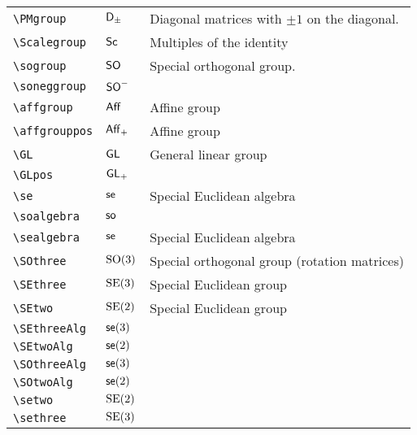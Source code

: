 \begin{longtable}{lll}
 {\color[rgb]{0.5,0.5,0.5}\texttt{\textbackslash PMgroup}} & $\mathsf{D}_{\pm}$ &   Diagonal matrices with $\pm 1$ on the diagonal.\\ 
 {\color[rgb]{0.5,0.5,0.5}\texttt{\textbackslash Scalegroup}} & $\mathsf{Sc}$ &   Multiples of the identity\\ 
 {\color[rgb]{0.5,0.5,0.5}\texttt{\textbackslash sogroup}} & $\mathsf{SO}$ &  Special orthogonal group.\\ 
 {\color[rgb]{0.5,0.5,0.5}\texttt{\textbackslash soneggroup}} & $\mathsf{SO}^{-}$ & \\ 
 {\color[rgb]{0.5,0.5,0.5}\texttt{\textbackslash affgroup}} & $\mathsf{Aff}$ &  Affine group \\ 
 {\color[rgb]{0.5,0.5,0.5}\texttt{\textbackslash affgrouppos}} & $\mathsf{Aff}_{+}$ &  Affine group \\ 
 {\color[rgb]{0.5,0.5,0.5}\texttt{\textbackslash GL}} & $\mathsf{GL}$ &  General linear group\\ 
 {\color[rgb]{0.5,0.5,0.5}\texttt{\textbackslash GLpos}} & $\mathsf{GL}_{+}$ &  \\ 
 {\color[rgb]{0.5,0.5,0.5}\texttt{\textbackslash se}} & $\mathsf{se}$ &  Special Euclidean algebra\\ 
 {\color[rgb]{0.5,0.5,0.5}\texttt{\textbackslash soalgebra}} & $\mathsf{so}$ & \\ 
 {\color[rgb]{0.5,0.5,0.5}\texttt{\textbackslash sealgebra}} & $\mathsf{se}$ &  Special Euclidean algebra\\ 
 {\color[rgb]{0.5,0.5,0.5}\texttt{\textbackslash SOthree}} & $\mathrm{SO(3)}$ &  Special orthogonal group (rotation matrices)\\ 
 {\color[rgb]{0.5,0.5,0.5}\texttt{\textbackslash SEthree}} & $\mathrm{SE(3)}$ &  Special Euclidean group \\ 
 {\color[rgb]{0.5,0.5,0.5}\texttt{\textbackslash SEtwo}} & $\mathrm{SE(2)}$ &  Special Euclidean group \\ 
 {\color[rgb]{0.5,0.5,0.5}\texttt{\textbackslash SEthreeAlg}} & $\mathsf{se}(3)$ & \\ 
 {\color[rgb]{0.5,0.5,0.5}\texttt{\textbackslash SEtwoAlg}} & $\mathsf{se}(2)$ & \\ 
 {\color[rgb]{0.5,0.5,0.5}\texttt{\textbackslash SOthreeAlg}} & $\mathsf{se}(3)$ & \\ 
 {\color[rgb]{0.5,0.5,0.5}\texttt{\textbackslash SOtwoAlg}} & $\mathsf{se}(2)$ & \\ 
 {\color[rgb]{0.5,0.5,0.5}\texttt{\textbackslash setwo}} & $\mathrm{SE(2)}$ & \\ 
 {\color[rgb]{0.5,0.5,0.5}\texttt{\textbackslash sethree}} & $\mathrm{SE(3)}$ & \\ 

\end{longtable}
